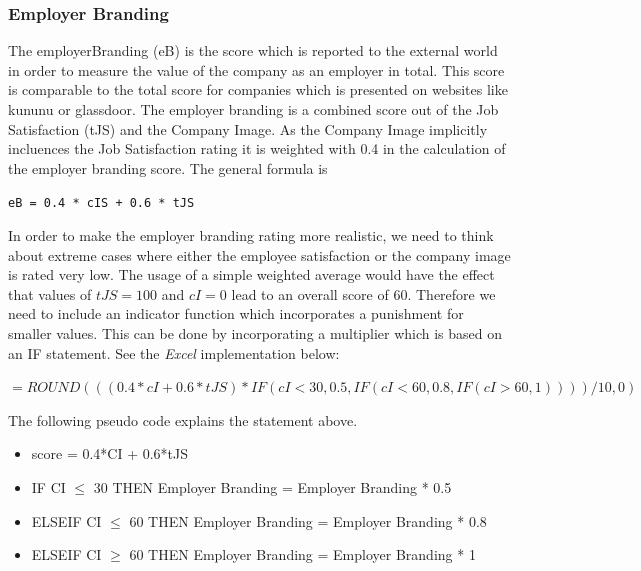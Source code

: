 \subsubsection{Employer Branding}\label{employer_branding}


The employerBranding (\gls{eB}) is the score which is reported to the external world in order to measure the value of the company as an employer in total. This score is comparable to the total score for companies which is presented on websites like kununu or glassdoor. The employer branding is a combined score out of the Job Satisfaction (\gls{tJS}) and the Company Image. As the Company Image implicitly incluences the Job Satisfaction rating it is weighted with 0.4 in the calculation of the employer branding score. The general formula is
\begin{center}
\texttt{eB = 0.4 * cIS + 0.6 * tJS} \\
\end{center}

In order to make the employer branding rating more realistic, we need to think about extreme cases where either the employee satisfaction or the company image is rated very low. The usage of a simple weighted average would have the effect that values of $tJS = 100$ and $cI = 0$ lead to an overall score of 60.
Therefore we need to include an indicator function which incorporates a punishment for smaller values.
This can be done by incorporating a multiplier which is based on an IF statement. See the \textit{Excel} implementation below:
\begin{center}
    $=ROUND(((0.4*cI+0.6*tJS)*IF(cI<30,0.5,IF(cI<60,0.8,IF(cI>60,1))))/10,0)$
\end{center}

The following pseudo code explains the statement above.

\begin{itemize}
    \item score = 0.4*CI + 0.6*tJS
    \item IF CI $\leq$ 30 THEN Employer Branding = Employer Branding * 0.5
    \item ELSEIF CI $\leq$ 60 THEN Employer Branding = Employer Branding * 0.8
    \item ELSEIF CI $\geq$ 60 THEN Employer Branding = Employer Branding * 1
\end{itemize}

